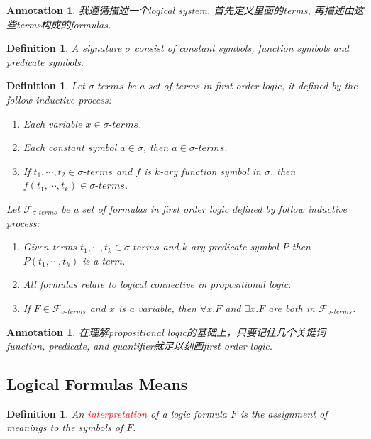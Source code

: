 \documentclass{article}
\theoremstyle{plain}
\newtheorem{definition}[theorem]{Definition}
\newtheorem{annotation}[theorem]{Annotation}
\theoremstyle{nonumberplain}
\newcommand{\redt}[1]{\textcolor{red}{#1}}
\begin{document}
\begin{annotation}
\rm 我遵循描述一个logical system, 首先定义里面的terms, 再描述由这些terms构成的formulas.
\end{annotation}

\begin{definition}
\rm A signature $\sigma$ consist of \emph{constant symbols}, \emph{function symbols} and \emph{predicate symbols}.  
\end{definition}

\begin{definition}
\rm Let $\sigma\text{-}terms$ be a set of terms in first order logic, it defined by the follow inductive process:
\begin{enumerate}
	\item Each variable $x \in \sigma\text{-}terms$.
	\item Each constant symbol $a \in \sigma$, then $a \in \sigma\text{-}terms$.
	\item If $t_1,\cdots,t_2 \in \sigma\text{-}terms$ and $f$ is $k$-ary function symbol in $\sigma$, then $f(t_1,\cdots,t_k)\in \sigma\text{-}terms$. 
\end{enumerate}
Let $\mathcal{F}_{\sigma\text{-}terms}$ be a set of formulas in first order logic defined by follow inductive process:
\begin{enumerate}
	\item Given terms $t_1, \cdots, t_k \in \sigma\text{-}terms$ and $k$-ary predicate symbol $P$ then $P(t_1,\cdots,t_k)$ is a term. 
	\item All formulas relate to logical connective in propositional logic.
	\item If $F \in \mathcal{F}_{\sigma\text{-}terms}$ and $x$ is a variable, then $\forall x. F$ and $\exists x. F$ are both in $\mathcal{F}_{\sigma\text{-}terms}$. 
\end{enumerate}
\end{definition}

\begin{annotation}
\rm 在理解propositional logic的基础上，只要记住几个关键词\emph{function}, \emph{predicate}, and \emph{quantifier}就足以刻画first order logic. 
\end{annotation}

\newpage
\subsection{Logical Formulas Means}

\begin{definition}
\rm An \redt{interpretation} of a logic formula $F$ is the assignment of meanings to the symbols of $F$.
\end{definition}
\end{document}
